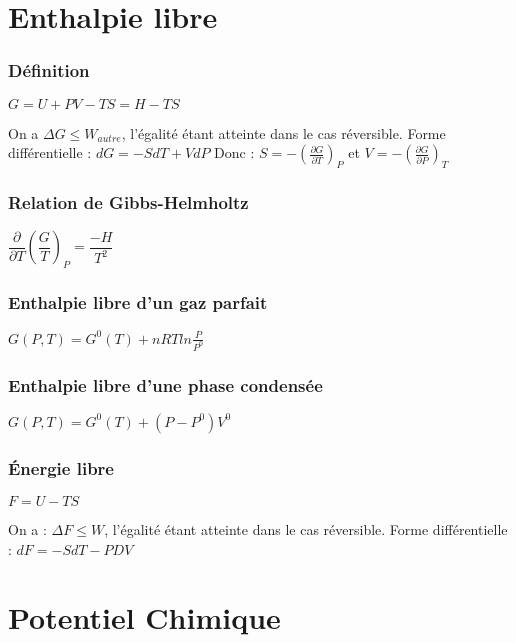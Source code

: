 \documentclass[9pt,twocolumn]{article}
\begin{document}
\setlength{\columnseprule}{0.1pt}


\part*{Enthalpie libre}
\section{Définition}
\begin{center}
$\boxed{G=U+PV-TS=H-TS}$
\end{center}

On a $\Delta G\leq W_{autre}$, l'égalité étant atteinte dans le cas réversible.
\medbreak
Forme différentielle : $\boxed{dG=-SdT+VdP}$
\medbreak
Donc : $S=-\left(\frac{\partial G}{\partial T}\right) _P$ et $V=-\left(\frac{\partial G}{\partial P}\right) _T$


\section{Relation de Gibbs-Helmholtz}
\begin{center}

$\displaystyle{\dfrac{\partial}{\partial T}\left( \dfrac{G}{T} \right) _P=\dfrac{-H}{T^2}}$
\end{center}


\section{Enthalpie libre d'un gaz parfait}
$\boxed{G(P,T)=G^0(T)+nRT ln\frac{P}{P^0}}$

\section{Enthalpie libre d'une phase condensée}
$\boxed{G(P,T)=G^0(T)+(P-P^0)V^0}$

\section{Énergie libre}

\begin{center}
$F=U-TS$
\end{center}
On a : $\Delta F\leq W$, l'égalité étant atteinte dans le cas réversible.
Forme différentielle : $dF=-SdT-PDV$



\part*{Potentiel Chimique}
\end{document}

